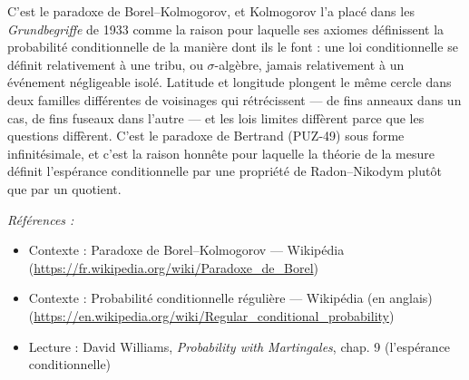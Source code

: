 \documentclass[11pt]{article}
\newenvironment{refs}{\par\small\noindent\emph{Références :}\begin{itemize}\setlength\itemsep{0pt}}{\end{itemize}\normalsize}
\begin{document}
\noindent C'est le paradoxe de Borel--Kolmogorov, et Kolmogorov l'a placé dans les
\textit{Grundbegriffe} de 1933 comme la raison pour laquelle ses axiomes définissent la
probabilité conditionnelle de la manière dont ils le font : une loi conditionnelle se
définit relativement à une tribu, ou $ \sigma $-algèbre, jamais relativement à un
événement négligeable isolé.
Latitude et longitude plongent le même cercle dans deux familles différentes de voisinages
qui rétrécissent --- de fins anneaux dans un cas, de fins fuseaux dans l'autre --- et les lois
limites diffèrent parce que les questions diffèrent. C'est le paradoxe de Bertrand (PUZ-49)
sous forme infinitésimale, et c'est la raison honnête pour laquelle la théorie de la mesure
définit l'espérance conditionnelle par une propriété de Radon--Nikodym plutôt que par un
quotient.

\begin{refs}
\item Contexte : Paradoxe de Borel--Kolmogorov --- Wikipédia (\url{https://fr.wikipedia.org/wiki/Paradoxe_de_Borel})
\item Contexte : Probabilité conditionnelle régulière --- Wikipédia (en anglais) (\url{https://en.wikipedia.org/wiki/Regular_conditional_probability})
\item Lecture : David Williams, \textit{Probability with Martingales}, chap. 9 (l'espérance conditionnelle)
\end{refs}

\bigskip
\end{document}
